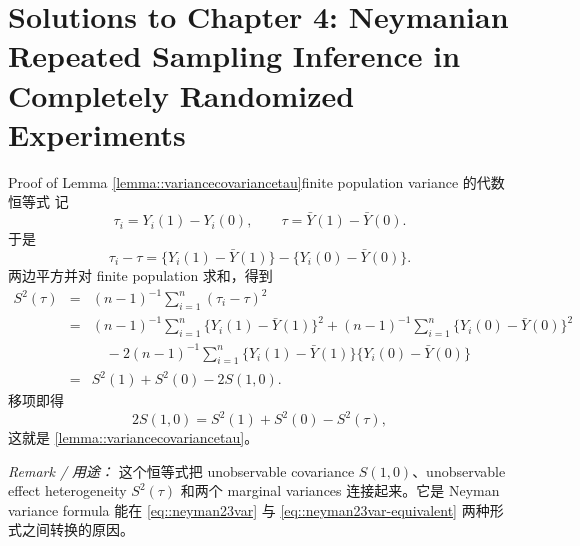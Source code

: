 \chapter{Solutions to Chapter 4: Neymanian Repeated Sampling Inference in Completely Randomized Experiments}
\label{sol:chapter04}

\begin{exercisesolution}{Proof of Lemma \ref{lemma::variancecovariancetau}}{finite population variance 的代数恒等式}
记
\[
\tau_i=Y_i(1)-Y_i(0),\qquad
\tau=\bar Y(1)-\bar Y(0).
\]
于是
\[
\tau_i-\tau
=\{Y_i(1)-\bar Y(1)\}-\{Y_i(0)-\bar Y(0)\}.
\]
两边平方并对 finite population 求和，得到
\begin{eqnarray*}
S^2(\tau)
&=&(n-1)^{-1}\sum_{i=1}^n(\tau_i-\tau)^2\\
&=&(n-1)^{-1}\sum_{i=1}^n\{Y_i(1)-\bar Y(1)\}^2
+(n-1)^{-1}\sum_{i=1}^n\{Y_i(0)-\bar Y(0)\}^2\\
&&\quad
-2(n-1)^{-1}\sum_{i=1}^n
\{Y_i(1)-\bar Y(1)\}\{Y_i(0)-\bar Y(0)\}\\
&=&S^2(1)+S^2(0)-2S(1,0).
\end{eqnarray*}
移项即得
\[
2S(1,0)=S^2(1)+S^2(0)-S^2(\tau),
\]
这就是 \cref{lemma::variancecovariancetau}。

\emph{Remark / 用途：} 这个恒等式把 unobservable covariance $S(1,0)$、unobservable effect heterogeneity $S^2(\tau)$ 和两个 marginal variances 连接起来。它是 Neyman variance formula 能在 \cref{eq::neyman23var} 与 \cref{eq::neyman23var-equivalent} 两种形式之间转换的原因。
\end{exercisesolution}

